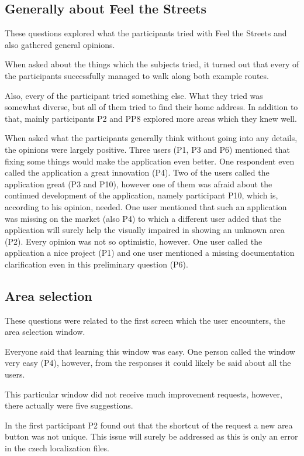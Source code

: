 \documentclass[nolof,digital]{fithesis3}
\begin{document}
\subsection{Generally about Feel the Streets}
These questions explored what the participants tried with Feel the Streets and also gathered general opinions.

When asked about the things which the subjects tried, it turned out that every of the participants successfully managed to walk along both example routes.

Also, every of the participant tried something else. What they tried was somewhat diverse, but all of them tried to find their home address. In addition to that, mainly participants P2 and PP8 explored more areas which they knew well.

When asked what the participants generally think without going into any details, the opinions were largely positive. Three users (P1, P3 and P6) mentioned that fixing some things would make the application even better. One respondent even called the application a great innovation (P4). Two of the users called the application great (P3 and P10), however one of them was afraid about the continued development of the application, namely participant P10,  which is, according to his opinion, needed. One user mentioned that such an application was missing on the market (also P4) to which a different user added that the application will surely help the visually impaired in showing an unknown area (P2). Every opinion was not so optimistic, however. One user called the application a nice project (P1) and one user mentioned a missing documentation clarification even in this preliminary question (P6).
\subsection{Area selection}
These questions were related to the first screen which the user encounters, the area selection window.

Everyone said that learning this window was easy. One person called the window very easy (P4), however, from the responses it could likely be said about all the users.

This particular window did not receive much improvement requests, however, there actually were five suggestions.

In the first participant P2 found out that the shortcut of the request a new area button was not unique. This issue will surely be addressed as this is only an error in the czech localization files.
\end{document}
